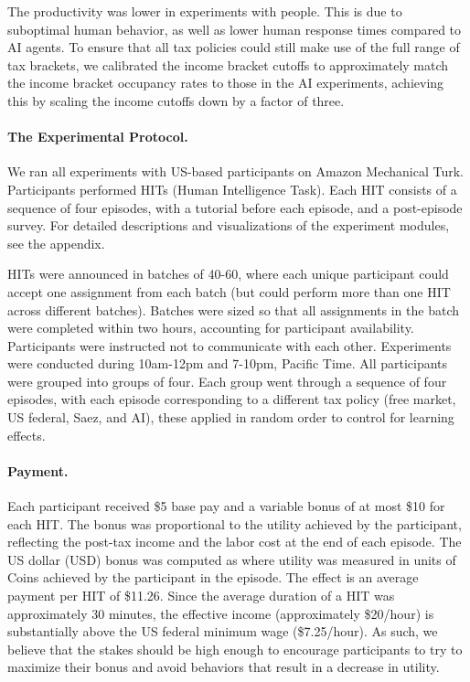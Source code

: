 The productivity was lower in experiments with people. This is due to suboptimal human behavior, as well as lower human response times compared to AI agents.
To ensure that all tax policies could still make use of the full range of tax brackets, we calibrated the income bracket cutoffs to approximately match the income bracket occupancy rates to those in the AI experiments, achieving this by scaling the income cutoffs down by a factor of three.
\paragraph{The Experimental Protocol.}
We ran all experiments with US-based participants on Amazon Mechanical Turk.
Participants performed HITs (Human Intelligence Task). Each HIT consists of a sequence of four episodes, with a tutorial before each episode, and a post-episode survey. For detailed descriptions and visualizations of the experiment modules, see the appendix.

HITs were announced  in batches of 40-60, where each unique participant could accept one assignment from each batch (but could perform more than one HIT across different batches).
Batches were sized so that all assignments in the batch were completed within two hours, accounting for participant availability.
Participants were instructed not to communicate with each other. Experiments were conducted during 10am-12pm and 7-10pm, Pacific Time.
All participants were grouped into groups of four. Each group went through a sequence of four episodes, with each episode corresponding to a different tax policy (free market, US federal, Saez, and AI), these applied in random order to control for learning effects.
\paragraph{Payment.}
Each participant received \$5 base pay and a variable bonus of at most \$10 for each HIT. The bonus was proportional to the utility achieved by the participant, reflecting the post-tax income and the labor cost at the end of each episode.
The US dollar (USD) bonus was computed as
where utility was measured in units of Coins achieved by the participant in the episode.
The effect is an average payment per HIT of \$11.26.
Since the average duration of a HIT was approximately 30 minutes, the effective income (approximately \$20/hour)  is substantially above the US federal minimum wage (\$7.25/hour). As such, we believe that the stakes should be high enough to encourage participants to try to maximize their bonus and avoid behaviors that result in a decrease in utility.

